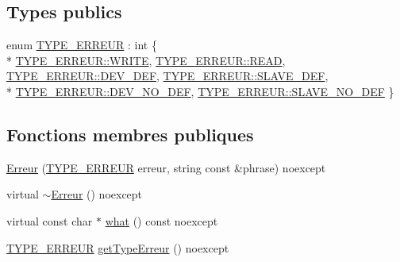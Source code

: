 \subsection*{Types publics}
\begin{DoxyCompactItemize}
\item 
enum \hyperlink{class_c_i2_c_1_1_erreur_a153281c8e751b72b355d52c548b511d5}{T\+Y\+P\+E\+\_\+\+E\+R\+R\+E\+U\+R} \+: int \{ \\*
\hyperlink{class_c_i2_c_1_1_erreur_a153281c8e751b72b355d52c548b511d5ad4b9e47f65b6e79b010582f15785867e}{T\+Y\+P\+E\+\_\+\+E\+R\+R\+E\+U\+R\+::\+W\+R\+I\+T\+E}, 
\hyperlink{class_c_i2_c_1_1_erreur_a153281c8e751b72b355d52c548b511d5a3466fab4975481651940ed328aa990e4}{T\+Y\+P\+E\+\_\+\+E\+R\+R\+E\+U\+R\+::\+R\+E\+A\+D}, 
\hyperlink{class_c_i2_c_1_1_erreur_a153281c8e751b72b355d52c548b511d5ae1f10060c3313d98dd2413dee71e18e2}{T\+Y\+P\+E\+\_\+\+E\+R\+R\+E\+U\+R\+::\+D\+E\+V\+\_\+\+D\+E\+F}, 
\hyperlink{class_c_i2_c_1_1_erreur_a153281c8e751b72b355d52c548b511d5ad9c45b0127babe676fc8586726b05874}{T\+Y\+P\+E\+\_\+\+E\+R\+R\+E\+U\+R\+::\+S\+L\+A\+V\+E\+\_\+\+D\+E\+F}, 
\\*
\hyperlink{class_c_i2_c_1_1_erreur_a153281c8e751b72b355d52c548b511d5ab25df6fa3e61307affa2644bd2251f0b}{T\+Y\+P\+E\+\_\+\+E\+R\+R\+E\+U\+R\+::\+D\+E\+V\+\_\+\+N\+O\+\_\+\+D\+E\+F}, 
\hyperlink{class_c_i2_c_1_1_erreur_a153281c8e751b72b355d52c548b511d5ac43160b89b55550045fa76263b24e616}{T\+Y\+P\+E\+\_\+\+E\+R\+R\+E\+U\+R\+::\+S\+L\+A\+V\+E\+\_\+\+N\+O\+\_\+\+D\+E\+F}
 \}
\end{DoxyCompactItemize}
\subsection*{Fonctions membres publiques}
\begin{DoxyCompactItemize}
\item 
\hyperlink{class_c_i2_c_1_1_erreur_a2db008616ca661df8df52d35e3fa26f9}{Erreur} (\hyperlink{class_c_i2_c_1_1_erreur_a153281c8e751b72b355d52c548b511d5}{T\+Y\+P\+E\+\_\+\+E\+R\+R\+E\+U\+R} erreur, string const \&phrase) noexcept
\item 
virtual \hyperlink{class_c_i2_c_1_1_erreur_a8ed19157b6dd1cfe68dba1d4d6fab2d2}{$\sim$\+Erreur} () noexcept
\item 
virtual const char $\ast$ \hyperlink{class_c_i2_c_1_1_erreur_af38041f60a330ca1603d462c01b118f3}{what} () const noexcept
\item 
\hyperlink{class_c_i2_c_1_1_erreur_a153281c8e751b72b355d52c548b511d5}{T\+Y\+P\+E\+\_\+\+E\+R\+R\+E\+U\+R} \hyperlink{class_c_i2_c_1_1_erreur_a1f9da2c2241b49e5be93bf99438190a1}{get\+Type\+Erreur} () noexcept
\end{DoxyCompactItemize}
